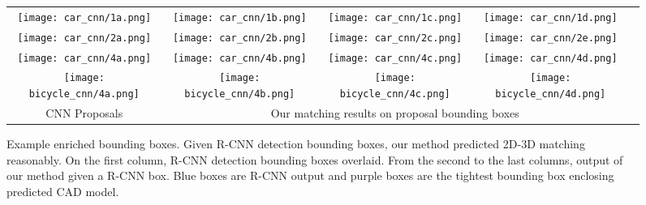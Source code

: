 \begin{figure*}[t]
\setlength\tabcolsep{1pt}
\centering
\begin{tabular}{|ccccc|}
   \hline
  \texttt{[image: car\_cnn/1a.png]} &   
  \texttt{[image: car\_cnn/1b.png]} &   
  \texttt{[image: car\_cnn/1c.png]} &   
  \texttt{[image: car\_cnn/1d.png]}  \\  
  \texttt{[image: car\_cnn/2a.png]} &   
  \texttt{[image: car\_cnn/2b.png]} &   
  \texttt{[image: car\_cnn/2c.png]} &   
  \texttt{[image: car\_cnn/2e.png]}  \\  
  \texttt{[image: car\_cnn/4a.png]} &   
  \texttt{[image: car\_cnn/4b.png]} &   
  \texttt{[image: car\_cnn/4c.png]} &   
  \texttt{[image: car\_cnn/4d.png]}  \\  
%
  \texttt{[image: bicycle\_cnn/4a.png]} &   
  \texttt{[image: bicycle\_cnn/4b.png]} &   
  \texttt{[image: bicycle\_cnn/4c.png]} &   
  \texttt{[image: bicycle\_cnn/4d.png]}  \\
  \hline
  CNN Proposals & \multicolumn{3}{|c|}{Our matching results on proposal bounding boxes} \\
  \hline
\end{tabular}
\caption{Example enriched bounding boxes. Given R-CNN\cite{Girshick14}
  detection bounding boxes, our method predicted 2D-3D matching
  reasonably. On the first column, R-CNN detection bounding boxes
  overlaid. From the second to the last columns, output of our method
  given a R-CNN box. Blue boxes are R-CNN output and purple boxes are
  the tightest bounding box enclosing predicted CAD model.}
  \label{fig:pascal12cnn}
\end{figure*}
